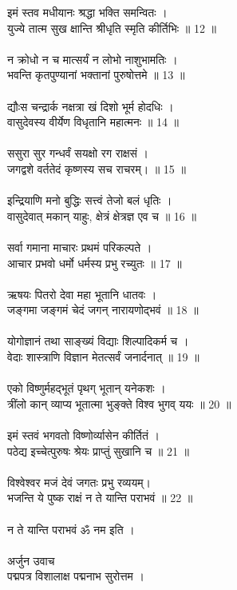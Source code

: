 इमं स्तव मधीयानः श्रद्धा भक्ति समन्वितः ।\\
युज्ये तात्म सुख क्षान्ति श्रीधृति स्मृति कीर्तिभिः ॥ 12 ॥\\
\\
न क्रोधो न च मात्सर्यं न लोभो नाशुभामतिः ।\\
भवन्ति कृतपुण्यानां भक्तानां पुरुषोत्तमे ॥ 13 ॥\\
\\
द्यौःस चन्द्रार्क नक्षत्रा खं दिशो भूर्म होदधिः ।\\
वासुदेवस्य वीर्येण विधृतानि महात्मनः ॥ 14 ॥\\
\\
ससुरा सुर गन्धर्वं सयक्षो रग राक्षसं ।\\
जगद्वशे वर्ततेदं कृष्णस्य सच राचरम्। ॥ 15 ॥\\
\\
इन्द्रियाणि मनो बुद्धिः सत्त्वं तेजो बलं धृतिः ।\\
वासुदेवात् मकान् याहुः, क्षेत्रं क्षेत्रज्ञ एव च ॥ 16 ॥\\
\\
सर्वा गमाना माचारः प्रथमं परिकल्पते ।\\
आचार प्रभवो धर्मो धर्मस्य प्रभु रच्युतः ॥ 17 ॥\\
\\
ऋषयः पितरो देवा महा भूतानि धातवः ।\\
जङ्गमा जङ्गमं चेदं जगन् नारायणोद्भवं ॥ 18 ॥\\
\\
योगोज्ञानं तथा साङ्ख्यं विद्याः शिल्पादिकर्म च ।\\
वेदाः शास्त्राणि विज्ञान मेतत्सर्वं जनार्दनात् ॥ 19 ॥\\
\\
एको विष्णुर्महद्भूतं पृथग् भूतान् यनेकशः ।\\
त्रींलो कान् व्याप्य भूतात्मा भुङ्क्ते विश्व भुगव् ययः ॥ 20 ॥\\
\\
इमं स्तवं भगवतो विष्णोर्व्यासेन कीर्तितं ।\\
पठेद्य इच्चेत्पुरुषः श्रेयः प्राप्तुं सुखानि च ॥ 21 ॥\\
\\
विश्वेश्वर मजं देवं जगतः प्रभु रव्ययम्।\\
भजन्ति ये पुष्क राक्षं न ते यान्ति पराभवं ॥ 22 ॥\\
\\
न ते यान्ति पराभवं ॐ नम इति ।\\
\\
अर्जुन उवाच\\
पद्मपत्र विशालाक्ष पद्मनाभ सुरोत्तम ।\\
